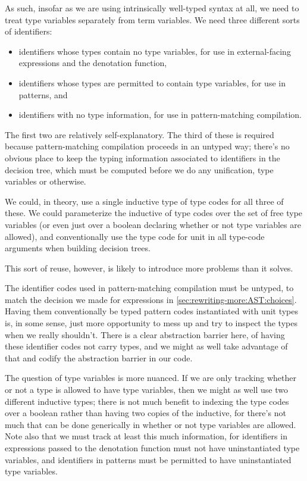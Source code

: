 As such, insofar as we are using intrinsically well-typed syntax at all, we need to treat type variables separately from term variables.
We need three different sorts of identifiers:
\begin{itemize}
\item
  identifiers whose types contain no type variables, for use in external-facing expressions and the denotation function,
\item
  identifiers whose types are permitted to contain type variables, for use in patterns, and
\item
  identifiers with no type information, for use in pattern-matching compilation.
\end{itemize}
The first two are relatively self-explanatory.
The third of these is required because pattern-matching compilation proceeds in an untyped way; there's no obvious place to keep the typing information associated to identifiers in the decision tree, which must be computed before we do any unification, type variables or otherwise.

We could, in theory, use a single inductive type of type codes for all three of these.
We could parameterize the inductive of type codes over the set of free type variables (or even just over a boolean declaring whether or not type variables are allowed), and conventionally use the type code for unit in all type-code arguments when building decision trees.

This sort of reuse, however, is likely to introduce more problems than it solves.

The identifier codes used in pattern-matching compilation must be untyped, to match the decision we made for expressions in \autoref{sec:rewriting-more:AST:choices}.
Having them conventionally be typed pattern codes instantiated with unit types is, in some sense, just more opportunity to mess up and try to inspect the types when we really shouldn't.
There is a clear abstraction barrier here, of having these identifier codes not carry types, and we might as well take advantage of that and codify the abstraction barrier in our code.

The question of type variables is more nuanced.
If we are only tracking whether or not a type is allowed to have type variables, then we might as well use two different inductive types; there is not much benefit to indexing the type codes over a boolean rather than having two copies of the inductive, for there's not much that can be done generically in whether or not type variables are allowed.
Note also that we must track at least this much information, for identifiers in expressions passed to the denotation function must not have uninstantiated type variables, and identifiers in patterns must be permitted to have uninstantiated type variables.

